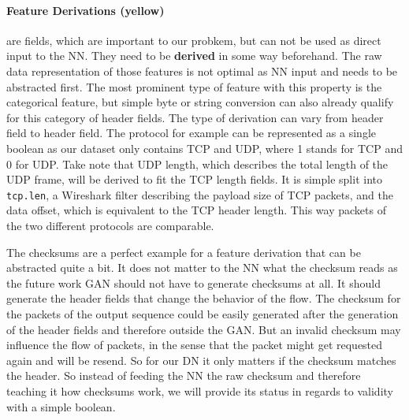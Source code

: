 \documentclass[
	ngerman,
	ruledheaders=section,%
	class=report,%
	thesis={type=bachelor},%
	accentcolor=9c,%
	custommargins=true,%
	marginpar=false,%
	parskip=half-,%
	fontsize=11pt,%
	twoside
]{tudapub}
\let\code\texttt
\begin{document}
\paragraph{\colorbox{derivation}{\textbf{Feature Derivations} (yellow)}} are fields, which are important to our probkem, but can not be used as direct input to the NN.
They need to be \textbf{derived} in some way beforehand.
The raw data representation of those features is not optimal as NN input and needs to be abstracted first.
The most prominent type of feature with this property is the categorical feature, but simple byte or string conversion can also already qualify for this category of header fields.
The type of derivation can vary from header field to header field.
The protocol for example can be represented as a single boolean as our dataset only contains TCP and UDP, where 1 stands for TCP and 0 for UDP.
Take note that UDP length, which describes the total length of the UDP frame, will be derived to fit the TCP length fields.
It is simple split into \code{tcp.len}, a Wireshark filter describing the payload size of TCP packets, and the data offset, which is equivalent to the TCP header length.
This way packets of the two different protocols are comparable.

The checksums are a perfect example for a feature derivation that can be abstracted quite a bit.
It does not matter to the NN what the checksum reads as the future work GAN should not have to generate checksums at all.
It should generate the header fields that change the behavior of the flow.
The checksum for the packets of the output sequence could be easily generated after the generation of the header fields and therefore outside the GAN.
But an invalid checksum may influence the flow of packets, in the sense that the packet might get requested again and will be resend.
So for our DN it only matters if the checksum matches the header.
So instead of feeding the NN the raw checksum and therefore teaching it how checksums work, we will provide its status in regards to validity with a simple boolean.
\end{document}
